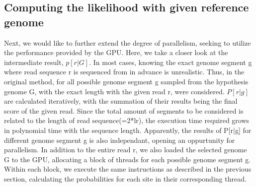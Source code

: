 \documentclass{PHlab-thesis}
\begin{document}
\subsection{Computing the likelihood with given reference genome}
Next, we would like to further extend the degree of parallelism, seeking to utilize the performance provided by the GPU. Here, we take a closer look at the intermediate result, $p[r|G]$. In most cases, knowing the exact genome segment g where read sequence r is sequenced from in advance is unrealistic. Thus, in the original method, for all possible genome segment g sampled from the hypothesis genome G, with the exact length with the given read r, were considered. $P[r|g]$ are calculated iteratively, with the summation of their results being the final score of the given read. Since the total amount of segments to be considered is related to the length of read sequence(=2*lr), the execution time required grows in polynomial time with the sequence length. Apparently, the results of P[r|g] for different genome segment g is also independant, opening an oppurtunity for parallelism. In addition to the entire read r, we also loaded the selected genome G to the GPU, allocating a block of threads for each possible genome segment g. Within each block, we execute the same instructions as described in the previous section, calculating the probabilities for each site in their corresponding thread.
\end{document}
